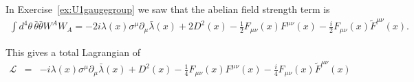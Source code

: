 \documentclass[notes.tex]{subfiles}
\begin{document}
\begin{Answer}
In Exercise~\ref{ex:U1gaugegroup} we saw that the abelian field strength term is
\begin{eqnarray}
\int d^4\theta\, \bar\theta\bar\theta W^AW_A = -2i\lambda(x)\sigma^\mu \partial_\mu \bar\lambda(x)+2D^2(x)-\frac{1}{2}F_{\mu\nu}(x)F^{\mu\nu}(x) -\frac{i}{2}F_{\mu\nu}(x)\tilde F^{\mu\nu}(x).
\end{eqnarray}

This gives a total Lagrangian of
\begin{eqnarray}
\mathcal L &=& -i\lambda(x)\sigma^\mu \partial_\mu \bar\lambda(x)+D^2(x)-\frac{1}{4}F_{\mu\nu}(x)F^{\mu\nu}(x) -\frac{i}{4}F_{\mu\nu}(x)\tilde F^{\mu\nu}(x)
\end{eqnarray}
\end{Answer}
\end{document}
